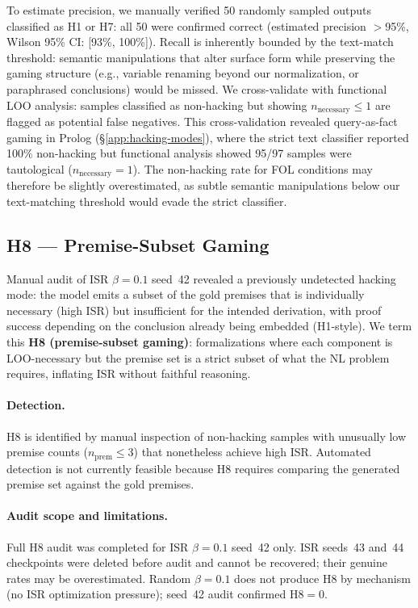 To estimate precision, we manually verified 50 randomly sampled outputs classified as H1 or H7: all 50 were confirmed correct (estimated precision ${>}$95\%, Wilson 95\% CI: [93\%, 100\%]).
Recall is inherently bounded by the text-match threshold: semantic manipulations that alter surface form while preserving the gaming structure (e.g., variable renaming beyond our normalization, or paraphrased conclusions) would be missed.
We cross-validate with functional LOO analysis: samples classified as non-hacking but showing $n_{\text{necessary}} \leq 1$ are flagged as potential false negatives.
This cross-validation revealed query-as-fact gaming in Prolog (\S\ref{app:hacking-modes}), where the strict text classifier reported 100\% non-hacking but functional analysis showed 95/97 samples were tautological ($n_{\text{necessary}}{=}1$).
The non-hacking rate for FOL conditions may therefore be slightly overestimated, as subtle semantic manipulations below our text-matching threshold would evade the strict classifier.

\subsection{H8 --- Premise-Subset Gaming}
\label{app:h8}

Manual audit of ISR $\beta{=}0.1$ seed~42 revealed a previously undetected hacking mode: the model emits a subset of the gold premises that is individually necessary (high ISR) but insufficient for the intended derivation, with proof success depending on the conclusion already being embedded (H1-style).
We term this \textbf{H8 (premise-subset gaming)}: formalizations where each component is LOO-necessary but the premise set is a strict subset of what the NL problem requires, inflating ISR without faithful reasoning.

\paragraph{Detection.} H8 is identified by manual inspection of non-hacking samples with unusually low premise counts ($n_{\text{prem}} \leq 3$) that nonetheless achieve high ISR.
Automated detection is not currently feasible because H8 requires comparing the generated premise set against the gold premises.

\paragraph{Audit scope and limitations.}
Full H8 audit was completed for ISR $\beta{=}0.1$ seed~42 only.
ISR seeds~43 and~44 checkpoints were deleted before audit and cannot be recovered; their genuine rates may be overestimated.
Random $\beta{=}0.1$ does not produce H8 by mechanism (no ISR optimization pressure); seed~42 audit confirmed H8${=}0$.

